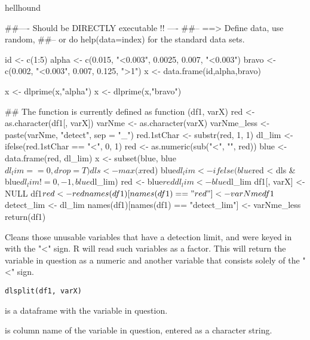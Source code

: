 \documentclass[letterpaper]{book}
\begin{document}
%
\begin{Author}\relax
hellhound
\end{Author}
%
\begin{Examples}
\begin{ExampleCode}
##---- Should be DIRECTLY executable !! ----
##-- ==>  Define data, use random,
##--	or do  help(data=index)  for the standard data sets.

id <- c(1:5)
alpha <- c(0.015, "<0.003", 0.0025, 0.007, "<0.003")
bravo <- c(0.002, "<0.003", 0.007, 0.125, ">1")
x <- data.frame(id,alpha,bravo)

x <- dlprime(x,"alpha")
x <- dlprime(x,"bravo")

## The function is currently defined as
function (df1, varX) 
{
    red <- as.character(df1[, varX])
    varNme <- as.character(varX)
    varNme_less <- paste(varNme, "detect", sep = "_")
    red.1stChar <- substr(red, 1, 1)
    dl_lim <- ifelse(red.1stChar == "<", 0, 1)
    red <- as.numeric(sub("<", "", red))
    blue <- data.frame(red, dl_lim)
    x <- subset(blue, blue$dl_lim == 0, drop = T)
    dls <- max(x$red)
    blue$dl_lim <- ifelse(blue$red < dls & blue$dl_lim != 0, 
        -1, blue$dl_lim)
    red <- blue$red
    dl_lim <- blue$dl_lim
    df1[, varX] <- NULL
    df1$red <- red
    names(df1)[names(df1) == "red"] <- varNme
    df1$detect_lim <- dl_lim
    names(df1)[names(df1) == "detect_lim"] <- varNme_less
    return(df1)
	}
\end{ExampleCode}
\end{Examples}
%
\begin{Description}\relax

Cleans those unusable variables that have a detection limit, and were keyed in with the "<" sign. R will read such variables as a factor. 
This will return the variable in question as a numeric and another variable that consists solely of the "<" sign.
\end{Description}
%
\begin{Usage}
\begin{verbatim}
dlsplit(df1, varX)
\end{verbatim}
\end{Usage}
%
\begin{Arguments}
\begin{ldescription}
\item[\code{df1}] 

is a dataframe with the variable in question. 

\item[\code{varX}] 

is column name of the variable in question, entered as a character string. 

\end{ldescription}
\end{Arguments}
\end{document}
